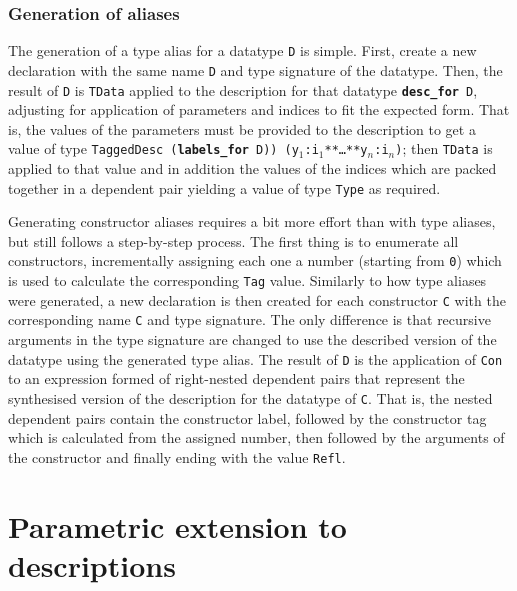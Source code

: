 \documentclass{ituthesis}
\newcommand{\ttconstructor}[1]{\textcolor{constructor-color}{\texttt{#1}}}
\newcommand{\tttype}[1]{\textcolor{type-color}{\texttt{#1}}}
\newcommand{\ttdec}[1]{\textcolor{declared-var-color}{\texttt{#1}}}
\newcommand{\ttvar}[1]{\textcolor{local-var-color}{\texttt{#1}}}
\newcommand{\ttliteral}[1]{\textcolor{literal-color}{\texttt{#1}}}
\theoremstyle{break}
\begin{document}
\subsubsection{Generation of aliases}
\label{ssub:Generation of aliases}
The generation of a type alias for a datatype \tttype{D} is simple.
First, create a new declaration with the same name \ttdec{D} and type signature of the datatype. 
Then, the result of \ttdec{D} is \ttdec{TData} applied to the description for that datatype \texttt{\textbf{desc\_for}}~\tttype{D}, adjusting for application of parameters and indices to fit the expected form.
That is, the values of the parameters must be provided to the description to get a value of type \ttdec{TaggedDesc}~\texttt{(\textbf{labels\_for}}~\tttype{D}\texttt{))}~\tttype{(}\ttvar{y$_1$}\texttt{:}\ttvar{i$_1$}\tttype{**}\texttt{\ldots}\tttype{**}\ttvar{y$_n$}\texttt{:}\ttvar{i$_n$}\tttype{)}; then
\ttdec{TData} is applied to that value and in addition the values of the indices which are packed together in a dependent pair yielding a value of type \tttype{Type} as required.

Generating constructor aliases requires a bit more effort than with type aliases, but still follows a step-by-step process.
The first thing is to enumerate all constructors, incrementally assigning each one a number (starting from \ttliteral{0}) which is used to calculate the corresponding \tttype{Tag} value.
Similarly to how type aliases were generated, a new declaration is then created for each constructor \ttconstructor{C} with the corresponding name \ttdec{C} and type signature.
The only difference is that recursive arguments in the type signature are changed to use the described version of the datatype using the generated type alias.
The result of \ttdec{D} is the application of \ttconstructor{Con} to an expression formed of right-nested dependent pairs that represent the synthesised version of the description for the datatype of \ttconstructor{C}.
That is, the nested dependent pairs contain the constructor label, followed by the constructor tag which is calculated from the assigned number, then followed by the arguments of the constructor
and finally ending with the value \ttconstructor{Refl}.

\section{Parametric extension to descriptions}
\label{sec:Parametricextensiontodescriptions}
\end{document}
